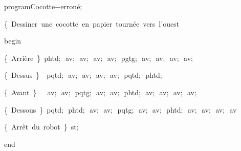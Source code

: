 
\vspace{\neglskip}\mbox{\blc  \idt  programCocotte$-$erroné$;$}\par 
\vspace{\neglskip}\mbox{\blc  \blk\idt  \cmt  \{\ Dessiner\ une\ cocotte\ en\ papier\ tournée\ vers\ l{'}ouest\idt }\par 
\vspace{\neglskip}\mbox{\blc  \idt  \mcl begin\idt }\par 
\vspace{\neglskip}\mbox{\blc  \blk\idt  \cmt \{\ Arrière\ \}\idt \ phtd$;$\ av$;$\ av$;$\ av$;$\ av$;$\ pgtg$;$\ av$;$\ av$;$\ av$;$\ av$;$\ }\par 
\vspace{\neglskip}\mbox{\blc  \blk\idt  \cmt  \{\ Dessus\ \}\idt \ \ pqtd$;$\ av$;$\ av$;$\ av$;$\ av$;$\ pqtd$;$\ phtd$;$\ }\par 
\vspace{\neglskip}\mbox{\blc  \blk\idt  \cmt  \{\ Avant\ \}\idt \ \ \ av$;$\ av$;$\ pqtg$;$\ av$;$\ av$;$\ phtd$;$\ av$;$\ av$;$\ av$;$\ av$;$\ }\par 
\vspace{\neglskip}\mbox{\blc  \blk\idt  \cmt  \{\ Dessous\ \}\idt \ pqtd$;$\ phtd$;$\ av$;$\ av$;$\ pqtg$;$\ av$;$\ av$;$\ phtd$;$\ av$;$\ av$;$\ av$;$\ av}\par 
\vspace{\neglskip}\mbox{\blc  \blk\idt  \cmt  \{\ Arrêt\ du\ robot\ \}\idt \ st$;$}\par 
\vspace{\neglskip}\mbox{\blc  \idt  \mcl end\idt }\par 

